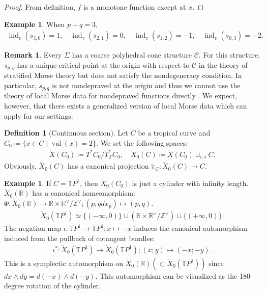 \documentclass[a4paper,dvipdfmx,reqno,12pt]{amsart}
\theoremstyle{definition}
\newtheorem{definition}[theorem]{Definition}
\newtheorem{example}[theorem]{Example}
\newtheorem{remark}[theorem]{Remark}
\newcommand{\deq}{\coloneqq}
\newcommand{\Z}{\mathbb{Z}}%
\newcommand{\opn}[1]{\operatorname{#1}}
\numberwithin{equation}{section}
\begin{document}
\begin{proof}
From definition, $f$ is a monotone function except 
at $x$.
\end{proof}

\begin{example}
When $p+q=3$, 
\begin{align}
\opn{ind}_v(s_{3,0})=1, \quad \opn{ind}_v(s_{2,1})=0, \quad \opn{ind}_v(s_{1,2})=-1, \quad \opn{ind}_v(s_{0,3})=-2.
\end{align}
\end{example}

\begin{remark}
\label{remark-nondeprave-curve}
Every $\Sigma$ has a coarse polyhedral cone structure 
$\mathscr{C}$. 
For this structure, $s_{p,q}$ has a unique critical 
point at the origin with respect to 
$\mathscr{C}$ in the theory of stratified 
Morse theory \cite[Part I.2.1]{MR932724}
but does not satisfy the nondegeneracy condition.
In particular, $s_{p,q}$ is not nondepraved 
at the origin \cite[Part I.2.3.]{MR932724} 
and thus we cannot use the theory of local Morse 
data for nondepraved functions directly 
\cite[Part I.3.5.2 Definition]{MR932724}. 
We expect, however, that there exists a 
generalized version of local Morse data 
which can apply for our settings. 
\end{remark}

\begin{definition}[{Continuous section}]
\label{definition-continuous-section}
Let $C$ be a tropical curve and 
$C_{0}\deq \{x\in C\mid \opn{val}(x)=2\}$.
We set the following spaces:
\begin{align}
\check{X}(C_0)\deq T^{*}C_0/T^{*}_{\Z}C_0, \quad 
\check{X}_0(C)\deq \check{X}(C_0)\sqcup_{i,s}C.
\end{align}
Obviously, $\check{X}_0(C)$ has a canonical projection
$\check{\pi}_C \colon \check{X}_0(C)\to C$.
\end{definition}

\begin{example}
If $C=\mathbb{T}P^{1}$, then 
$\check{X}_0(C_0)$ is just a 
cylinder with infinity length.
$\check{X}_0(\mathbb{R})$ has a canonical homeomorphism:
$\Phi \colon \check{X}_0(\mathbb{R})\to 
\mathbb{R}\times \mathbb{R}^{\vee}/\mathbb{Z}^{\vee};
(p,q dx_p)\mapsto (p,q)$.
\begin{align}
\check{X}_0(\mathbb{T}P^{1})\simeq 
\{(-\infty,0)\}\cup(\mathbb{R}\times \mathbb{R}^{\vee}/\mathbb{Z}^{\vee})
\cup \{(+\infty,0)\}.
\end{align}
The negation map
$\iota \colon\mathbb{T}P^{1}\to \mathbb{T}P^{1}; x\mapsto -x$
induces the canonical automorphism induced from the pullback of cotangent bundles:
\begin{align}
\iota^{*}\colon \check{X}_0(\mathbb{T}P^{1})
\to \check{X}_0(\mathbb{T}P^{1}); (x;y)\mapsto (-x;-y). 
\end{align}
This is a symplectic automorphism on 
$\check{X}_0(\mathbb{R}) (\subset \check{X}_0(\mathbb{T}P^{1}))$ since 
$dx\wedge dy=d(-x)\wedge d(-y)$.
This automorphism can be visualized as the 180-degree rotation of the 
cylinder.
\end{example}
\end{document}
